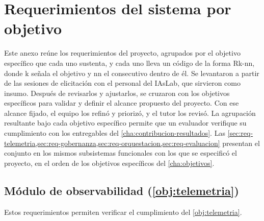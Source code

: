 \chapter{Requerimientos del sistema por objetivo}\label{anx:requerimientos}

Este anexo reúne los requerimientos del proyecto, agrupados por el objetivo específico que cada uno sustenta, y cada uno lleva un código de la forma Rk-nn, donde k señala el objetivo y nn el consecutivo dentro de él. Se levantaron a partir de las sesiones de elicitación con el personal del IAsLab, que sirvieron como insumo. Después de revisarlos y ajustarlos, se cruzaron con los objetivos específicos para validar y definir el alcance propuesto del proyecto. Con ese alcance fijado, el equipo los refinó y priorizó, y el tutor los revisó. La agrupación resultante bajo cada objetivo específico permite que un evaluador verifique su cumplimiento con los entregables del \cref{cha:contribucion-resultados}. Las \cref{sec:req-telemetria,sec:req-gobernanza,sec:req-orquestacion,sec:req-evaluacion} presentan el conjunto en los mismos subsistemas funcionales con los que se especificó el proyecto, en el orden de los objetivos específicos del \cref{cha:objetivos}.

\section[Módulo de observabilidad (Objetivo 1)]{Módulo de observabilidad (\cref{obj:telemetria})}
\label{sec:req-telemetria}

Estos requerimientos permiten verificar el cumplimiento del \cref{obj:telemetria}.

